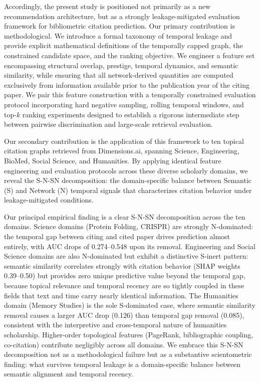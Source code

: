 \documentclass[11pt,a4paper]{article}
\begin{document}
Accordingly, the present study is positioned not primarily as a new recommendation architecture, but as a strongly leakage-mitigated evaluation framework for bibliometric citation prediction. Our primary contribution is methodological. We introduce a formal taxonomy of temporal leakage and provide explicit mathematical definitions of the temporally capped graph, the constrained candidate space, and the ranking objective. We engineer a feature set encompassing structural overlap, prestige, temporal dynamics, and semantic similarity, while ensuring that all network-derived quantities are computed exclusively from information available prior to the publication year of the citing paper. We pair this feature construction with a temporally constrained evaluation protocol incorporating hard negative sampling, rolling temporal windows, and top-$k$ ranking experiments designed to establish a rigorous intermediate step between pairwise discrimination and large-scale retrieval evaluation.

Our secondary contribution is the application of this framework to ten topical citation graphs retrieved from Dimensions.ai, spanning Science, Engineering, BioMed, Social Science, and Humanities. By applying identical feature engineering and evaluation protocols across these diverse scholarly domains, we reveal the S-N-SN decomposition: the domain-specific balance between Semantic (S) and Network (N) temporal signals that characterizes citation behavior under leakage-mitigated conditions.

Our principal empirical finding is a clear S-N-SN decomposition across the ten domains. Science domains (Protein Folding, CRISPR) are strongly N-dominated: the temporal gap between citing and cited paper drives prediction almost entirely, with AUC drops of 0.274--0.548 upon its removal. Engineering and Social Science domains are also N-dominated but exhibit a distinctive S-inert pattern: semantic similarity correlates strongly with citation behavior (SHAP weights 0.39--0.50) but provides zero unique predictive value beyond the temporal gap, because topical relevance and temporal recency are so tightly coupled in these fields that text and time carry nearly identical information. The Humanities domain (Memory Studies) is the sole S-dominated case, where semantic similarity removal causes a larger AUC drop (0.126) than temporal gap removal (0.085), consistent with the interpretive and cross-temporal nature of humanities scholarship. Higher-order topological features (PageRank, bibliographic coupling, co-citation) contribute negligibly across all domains. We embrace this S-N-SN decomposition not as a methodological failure but as a substantive scientometric finding: what survives temporal leakage is a domain-specific balance between semantic alignment and temporal recency.
\end{document}
